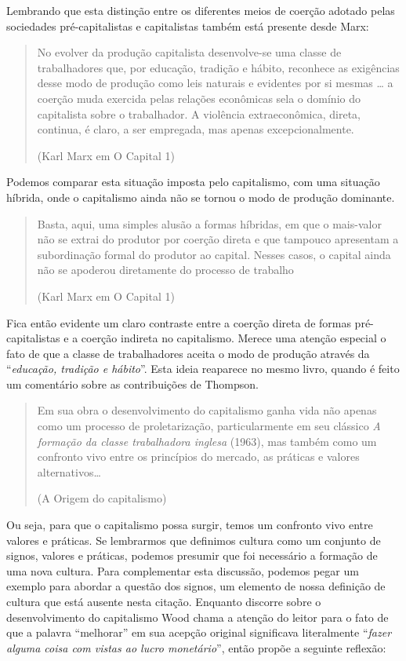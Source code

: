 Lembrando que esta distinção entre os diferentes meios de coerção adotado pelas sociedades pré-capitalistas e capitalistas também está presente desde Marx:

\begin{quote}
No evolver da produção capitalista desenvolve-se uma classe de trabalhadores que, por educação, tradição e hábito, reconhece as exigências desse modo de produção como leis naturais e evidentes por si mesmas … a coerção muda exercida pelas relações econômicas sela o domínio do capitalista sobre o trabalhador. A violência extraeconômica, direta, continua, é claro, a ser empregada, mas apenas excepcionalmente.

(Karl Marx em O Capital 1)
\end{quote}

Podemos comparar esta situação imposta pelo capitalismo, com uma situação híbrida, onde o capitalismo ainda não se tornou o modo de produção dominante.

\begin{quote}
Basta, aqui, uma simples alusão a formas híbridas, em que o mais-valor não se extrai do produtor por coerção direta e que tampouco apresentam a subordinação formal do produtor ao capital. Nesses casos, o capital ainda não se apoderou diretamente do processo de trabalho

(Karl Marx em O Capital 1)
\end{quote}

Fica então evidente um claro contraste entre a coerção direta de formas pré-capitalistas e a coerção indireta no capitalismo.  Merece uma atenção especial o fato de que a classe de trabalhadores aceita o modo de produção através da “\textit{educação, tradição e hábito}”. Esta ideia reaparece no mesmo livro,  quando é feito um comentário sobre as contribuições de Thompson.

\begin{quote}
Em sua obra o desenvolvimento do capitalismo ganha vida não apenas como um processo de proletarização, particularmente em seu clássico \textit{A formação da classe trabalhadora inglesa} (1963), mas também como um confronto vivo entre os princípios do mercado, as práticas e valores alternativos…

(A Origem do capitalismo)
\end{quote}

Ou seja, para que o capitalismo possa surgir, temos um confronto vivo entre valores e práticas. Se lembrarmos que definimos cultura como um conjunto de signos, valores e práticas, podemos presumir que foi necessário a formação de uma nova cultura. Para complementar esta discussão, podemos pegar um exemplo para abordar a questão dos signos, um elemento de nossa definição de cultura que está ausente nesta citação. Enquanto discorre sobre o desenvolvimento do capitalismo Wood chama a atenção do leitor para o fato de que a palavra “melhorar” em sua acepção original significava literalmente “\textit{fazer alguma coisa com vistas ao lucro monetário}”, então propõe a seguinte reflexão:

